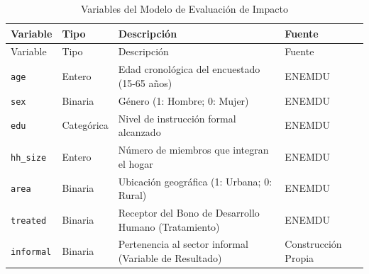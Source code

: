 \documentclass[12pt,spanish]{article}
\begin{document}
\begin{longtable}[]{@{}
  >{\raggedright\arraybackslash}p{}
  >{\raggedright\arraybackslash}p{}
  >{\raggedright\arraybackslash}p{}
  >{\raggedright\arraybackslash}p{}@{}}
\caption{Variables del Modelo de Evaluación de
Impacto}\label{tbl-variables}\tabularnewline
\toprule\noalign{}
\begin{minipage}[b]{\linewidth}\raggedright
Variable
\end{minipage} & \begin{minipage}[b]{\linewidth}\raggedright
Tipo
\end{minipage} & \begin{minipage}[b]{\linewidth}\raggedright
Descripción
\end{minipage} & \begin{minipage}[b]{\linewidth}\raggedright
Fuente
\end{minipage} \\
\midrule\noalign{}
\endfirsthead
\toprule\noalign{}
\begin{minipage}[b]{\linewidth}\raggedright
Variable
\end{minipage} & \begin{minipage}[b]{\linewidth}\raggedright
Tipo
\end{minipage} & \begin{minipage}[b]{\linewidth}\raggedright
Descripción
\end{minipage} & \begin{minipage}[b]{\linewidth}\raggedright
Fuente
\end{minipage} \\
\midrule\noalign{}
\endhead
\bottomrule\noalign{}
\endlastfoot
\texttt{age} & Entero & Edad cronológica del encuestado (15-65 años) &
ENEMDU \\
\texttt{sex} & Binaria & Género (1: Hombre; 0: Mujer) & ENEMDU \\
\texttt{edu} & Categórica & Nivel de instrucción formal alcanzado &
ENEMDU \\
\texttt{hh\_size} & Entero & Número de miembros que integran el hogar &
ENEMDU \\
\texttt{area} & Binaria & Ubicación geográfica (1: Urbana; 0: Rural) &
ENEMDU \\
\texttt{treated} & Binaria & Receptor del Bono de Desarrollo Humano
(Tratamiento) & ENEMDU \\
\texttt{informal} & Binaria & Pertenencia al sector informal (Variable
de Resultado) & Construcción Propia \\
\end{longtable}
\end{document}
